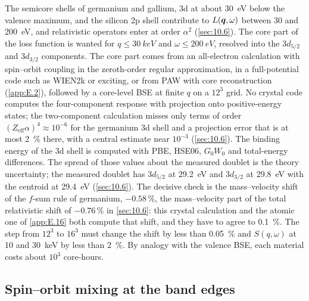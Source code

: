 The semicore shells of germanium and gallium, 3d at about \SI{30}{eV} below the valence maximum, and the silicon 2p shell contribute to $L(\bm{q},\omega)$ between 30 and \SI{200}{eV}, and relativistic operators enter at order $\alpha^2$ (\cref{sec:10.6}). The core part of the loss function is wanted for $q \le \SI{30}{keV}$ and $\omega \le \SI{200}{eV}$, resolved into the $3d_{5/2}$ and $3d_{3/2}$ components. The core part comes from an all-electron calculation with spin--orbit coupling in the zeroth-order regular approximation, in a full-potential code such as WIEN2k or exciting, or from PAW with core reconstruction (\cref{app:E.2}), followed by a core-level BSE at finite $q$ on a $12^3$ grid. No crystal code computes the four-component response with projection onto positive-energy states; the two-component calculation misses only terms of order $(Z_{\mathrm{eff}}\alpha)^4 \approx 10^{-6}$ for the germanium 3d shell and a projection error that is at most \SI{2}{\percent} there, with a central estimate near $10^{-3}$ (\cref{sec:10.6}). The binding energy of the 3d shell is computed with PBE, HSE06, $G_0W_0$ and total-energy differences. The spread of those values about the measured doublet is the theory uncertainty; the measured doublet has $3d_{5/2}$ at \SI{29.2}{eV} and $3d_{3/2}$ at \SI{29.8}{eV} with the centroid at \SI{29.4}{eV} (\cref{sec:10.6}). The decisive check is the mass--velocity shift of the $f$-sum rule of germanium, $-0.58\,\%$, the mass--velocity part of the total relativistic shift of $-0.76\,\%$ in \cref{sec:10.6}: this crystal calculation and the atomic one of \cref{app:E.16} both compute that shift, and they have to agree to \SI{0.1}{\percent}. The step from $12^3$ to $16^3$ must change the shift by less than \SI{0.05}{\percent} and $S(q,\omega)$ at 10 and \SI{30}{keV} by less than \SI{2}{\percent}. By analogy with the valence BSE, each material costs about $10^3$ core-hours.

\subsection{Spin--orbit mixing at the band edges}

